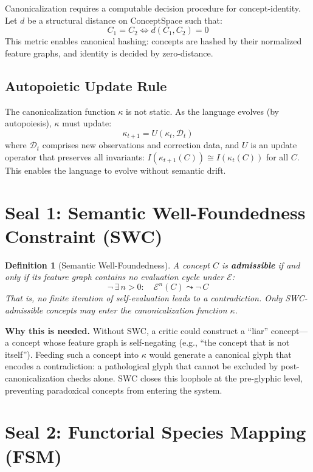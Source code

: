 \documentclass[12pt, letterpaper]{book}
\def\equiv{=}%
\newtheorem{definition}{Definition}[chapter]
\begin{document}
Canonicalization requires a computable decision procedure for concept-identity. Let $d$ be a structural distance on ConceptSpace such that:
\[
C_1 \equiv C_2 \iff d(C_1, C_2) = 0
\]
This metric enables canonical hashing: concepts are hashed by their normalized feature graphs, and identity is decided by zero-distance.

\subsection{Autopoietic Update Rule}\label{sec:update-rule}

The canonicalization function $\kappa$ is not static. As the language evolves (by autopoiesis), $\kappa$ must update:
\[
\kappa_{t+1} = U(\kappa_t, \mathcal{D}_t)
\]
where $\mathcal{D}_t$ comprises new observations and correction data, and $U$ is an update operator that preserves all invariants: $I(\kappa_{t+1}(C)) \cong I(\kappa_t(C))$ for all $C$. This enables the language to evolve without semantic drift.

\section{Seal 1: Semantic Well-Foundedness Constraint (SWC)}

\begin{definition}[Semantic Well-Foundedness]\label{def:swc}
A concept $C$ is \textbf{admissible} if and only if its feature graph contains no evaluation cycle under $\mathcal{E}$:
\[
\neg\, \exists\, n > 0: \quad \mathcal{E}^n(C) \leadsto \neg\, C
\]
That is, no finite iteration of self-evaluation leads to a contradiction. Only SWC-admissible concepts may enter the canonicalization function $\kappa$.
\end{definition}

\textbf{Why this is needed.} Without SWC, a critic could construct a ``liar'' concept---a concept whose feature graph is self-negating (e.g., ``the concept that is not itself''). Feeding such a concept into $\kappa$ would generate a canonical glyph that encodes a contradiction: a pathological glyph that cannot be excluded by post-canonicalization checks alone. SWC closes this loophole at the pre-glyphic level, preventing paradoxical concepts from entering the system.

\section{Seal 2: Functorial Species Mapping (FSM)}\label{sec:fsm-seal}
\end{document}
